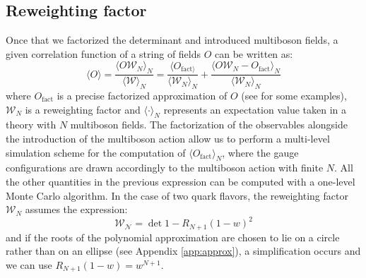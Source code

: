 \subsection{Reweighting factor}
Once that we factorized the determinant and introduced multiboson fields, a given correlation function of a string of fields $O$ can be written as:
\begin{equation}
    \langle O \rangle = \frac{\langle O \mathcal{W}_N \rangle_N}{\langle \mathcal{W} \rangle_N } = \frac{\langle O_{\textrm{fact}\rangle}}{\langle \mathcal{W}_N \rangle_N} + \frac{\langle O\mathcal{W}_N - O_{\textrm{fact}} \rangle_N}{\langle \mathcal{W}_N \rangle_N}
\end{equation}
where $O_{\textrm{fact}}$ is a precise factorized approximation of $O$ (see \cite{C__2016} for some examples), $\mathcal{W}_N$ is a reweighting factor and $\langle \cdot \rangle_N$ represents an expectation value taken in a theory with $N$ multiboson fields. The factorization of the observables alongside the introduction of the multiboson action allow us to perform a multi-level simulation scheme for the computation of $\langle O_{\textrm{fact}} \rangle_N$, where the gauge configurations are drawn accordingly to the multiboson action with finite $N$. All the other quantities in the previous expression can be computed with a one-level Monte Carlo algorithm. In the case of two quark flavors, the reweighting factor $\mathcal{W}_N$ assumes the expression:
\begin{equation}
    \mathcal{W_N} = \det{1 - R_{N+1}(1-w)}^2
\end{equation}
and if the roots of the polynomial approximation are chosen to lie on a circle rather than on an ellipse (see Appendix \eqref{app:approx}), a simplification occurs and we can use $R_{N+1}(1-w) = w^{N+1}$.